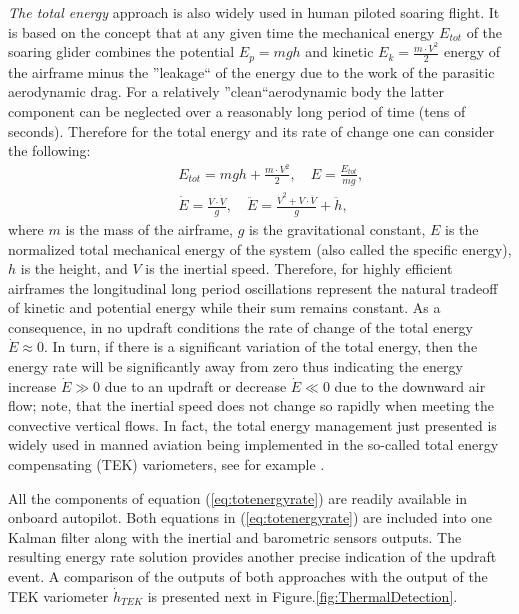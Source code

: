 \documentclass{ifacconf}
\begin{document}
\emph{The total energy} approach is also widely used in human piloted soaring flight. It is based on the concept that at any given time the mechanical energy $E_{tot}$ of the soaring glider combines the potential $E_p=mgh$ and kinetic $E_k=\frac{m\cdot V^2}{2}$ energy of the airframe minus the ''leakage`` of the energy due to the work of the parasitic aerodynamic drag. For a relatively ''clean``aerodynamic body the latter component can be neglected over a reasonably long period of time (tens of seconds). Therefore for the total energy and its rate of change one can consider the following:
\begin{eqnarray}
    && E_{tot}=mgh+\frac{m\cdot V^2}{2}, \quad E=\frac{E_{tot}}{mg}, \nonumber \\
    && \dot{E}=\frac{V \cdot \dot{V}}{g}, \quad \ddot{E}=\frac{\dot{V}^2 + V \cdot \ddot{V}}{g} + \ddot{h},
    \label{eq:totenergyrate}
\end{eqnarray}
where $m$ is the mass of the airframe, $g$ is the gravitational constant, $E$ is the normalized total mechanical energy of the system (also called the specific energy), $h$ is the height, and $V$ is the inertial speed. Therefore, for highly efficient airframes the longitudinal long period oscillations represent the natural tradeoff of kinetic and potential energy while their sum remains constant. As a consequence, in no updraft conditions the rate of change of the total energy $\dot{E}\approx 0$. In turn, if there is a significant variation of the total energy, then the energy rate will be significantly away from zero thus indicating the energy increase $\dot{E} \gg 0$ due to an updraft or decrease $\dot{E} \ll 0$ due to the downward air flow; note, that the inertial speed does not change so rapidly when meeting the convective vertical flows. In fact, the total energy management just presented is widely used in manned aviation being implemented in the so-called total energy compensating (TEK) variometers, see for example \cite{PitLab:2013:Online}.

All the components of equation (\ref{eq:totenergyrate}) are readily available in onboard autopilot. Both equations in (\ref{eq:totenergyrate}) are included into one Kalman filter along with the inertial and barometric sensors outputs. The resulting energy rate solution provides another precise indication of the updraft event. A comparison of the outputs of both approaches with the output  of the TEK variometer $\dot{h}_{TEK}$ is presented next in Figure.\ref{fig:ThermalDetection}.
\end{document}

